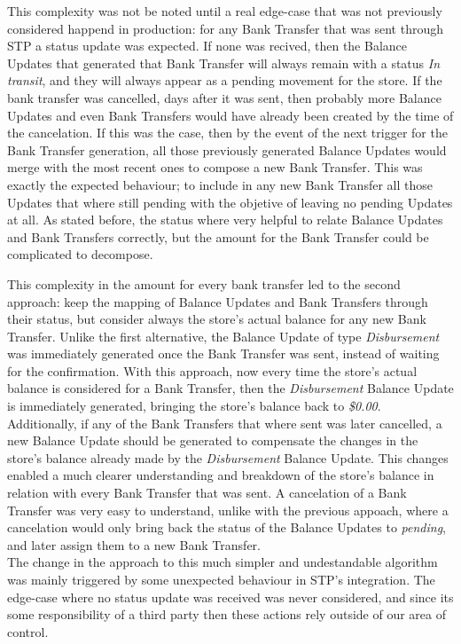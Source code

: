This complexity was not be noted until a real edge-case that was not previously considered happend in production: for any Bank Transfer that was sent through STP a status update was expected. If none was recived, then the Balance Updates that generated that Bank Transfer will always remain with a status \textit{In transit}, and they will always appear as a pending movement for the store. If the bank transfer was cancelled, days after it was sent, then probably more Balance Updates and even Bank Transfers would have already been created by the time of the cancelation. If this was the case, then by the event of the next trigger for the Bank Transfer generation, all those previously generated Balance Updates would merge with the most recent ones to compose a new Bank Transfer. This was exactly the expected behaviour; to include in any new Bank Transfer all those Updates that where still pending with the objetive of leaving no pending Updates at all. As stated before, the status where very helpful to relate Balance Updates and Bank Transfers correctly, but the amount for the Bank Transfer could be complicated to decompose.

This complexity in the amount for every bank transfer led to the second approach: keep the mapping of Balance Updates and Bank Transfers through their status, but consider always the store's actual balance for any new Bank Transfer. Unlike the first alternative, the Balance Update of type \textit{Disbursement} was immediately generated once the Bank Transfer was sent, instead of waiting for the confirmation. With this approach, now every time the store's actual balance is considered for a Bank Transfer, then the \textit{Disbursement} Balance Update is immediately generated, bringing the store's balance back to \textit{\$0.00}.\\ 


Additionally, if any of the Bank Transfers that where sent was later cancelled, a new Balance Update should be generated to compensate the changes in the store's balance already made by the \textit{Disbursement} Balance Update. This changes enabled a much clearer understanding and breakdown of the store's balance in relation with every Bank Transfer that was sent. A cancelation of a Bank Transfer was very easy to understand, unlike with the previous appoach, where a cancelation would only bring back the status of the Balance Updates to \textit{pending}, and later assign them to a new Bank Transfer.\\ 

The change in the approach to this much simpler and undestandable algorithm was mainly triggered by some unexpected behaviour in STP's integration. The edge-case where no status update was received was never considered, and since its some responsibility of a third party then these actions rely outside of our area of control. 




